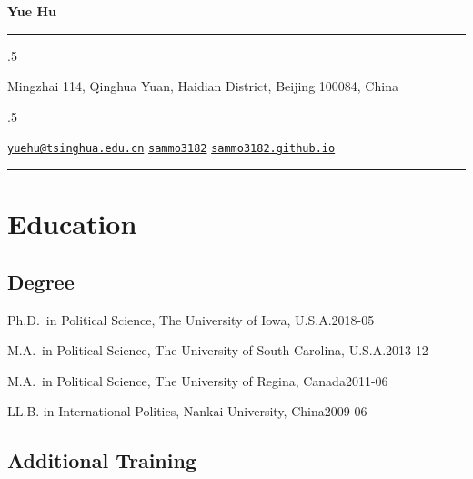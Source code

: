 \documentclass[10.5pt,]{article}
\providecommand{\tightlist}{%
	\setlength{\itemsep}{0pt}\setlength{\parskip}{0pt}}
\renewenvironment{itemize}{
	\begin{list}{}{
			\setlength{\leftmargin}{1.5em}
		}
	}{
	\end{list}
}
\begin{document}
	
	
	\centerline{\huge \bf Yue Hu}
	
	
	
	\vspace{2 mm}
	
	\hrule
	
	\vspace{2 mm}
	
	
	\moveleft.5\hoffset\centerline{Mingzhai 114, Qinghua Yuan, Haidian District, Beijing 100084, China}
	\moveleft.5\hoffset\centerline{ {\FA\faEnvelope} \hspace{1 mm} \href{mailto:}{\tt \href{mailto:yuehu@tsinghua.edu.cn}{\nolinkurl{yuehu@tsinghua.edu.cn}}} \hspace{1 mm}  {\FA\faGithub} \hspace{1 mm} \href{http://github.com/sammo3182}{\tt sammo3182} \hspace{1 mm}    {\FA\faGlobe} \hspace{1 mm} \href{http://sammo3182.github.io}{\tt sammo3182.github.io}   }
	
	\vspace{2 mm}
	
	\hrule
	
		
	\hypertarget{education}{%
\section{Education}\label{education}}

\hypertarget{degree}{%
\subsection{Degree}\label{degree}}

\begin{itemize}
\tightlist
\item
  Ph.D.~in Political Science, The University of Iowa,
  U.S.A.\hfill 2018-05
\item
  M.A.~in Political Science, The University of South Carolina,
  U.S.A.\hfill 2013-12
\item
  M.A.~in Political Science, The University of Regina,
  Canada\hfill 2011-06
\item
  LL.B. in International Politics, Nankai University,
  China\hfill 2009-06
\end{itemize}

\hypertarget{additional-training}{%
\subsection{Additional Training}\label{additional-training}}
\end{document}
